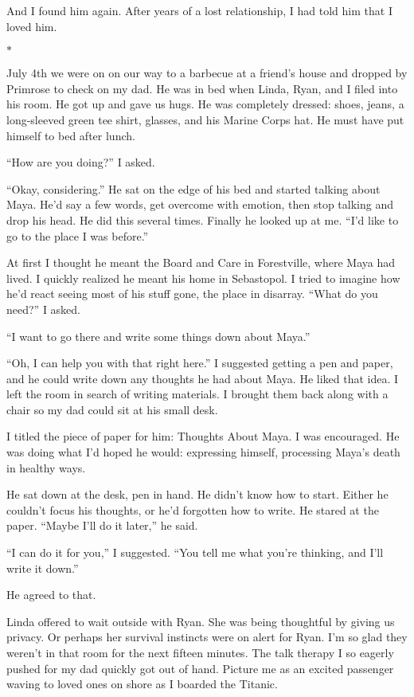 \documentclass[12pt]{book}
\begin{document}
And I found him again. After years of a lost relationship, I had told him that I loved him.

\begin{center}$*$\end{center}

July 4th we were on on our way to a barbecue at a friend's house and dropped by Primrose to check on my dad. He was in bed when Linda, Ryan, and I filed into his room. He got up and gave us hugs. He was completely dressed: shoes, jeans, a long-sleeved green tee shirt, glasses, and his Marine Corps hat. He must have put himself to bed after lunch.

``How are you doing?'' I asked.

``Okay, considering.'' He sat on the edge of his bed and started talking about Maya. He'd say a few words, get overcome with emotion, then stop talking and drop his head. He did this several times. Finally he looked up at me. ``I'd like to go to the place I was before.''

At first I thought he meant the Board and Care in Forestville, where Maya had lived. I quickly realized he meant his home in Sebastopol. I tried to imagine how he'd react seeing most of his stuff gone, the place in disarray. ``What do you need?'' I asked.

``I want to go there and write some things down about Maya.''

``Oh, I can help you with that right here.'' I suggested getting a pen and paper, and he could write down any thoughts he had about Maya. He liked that idea. I left the room in search of writing materials. I brought them back along with a chair so my dad could sit at his small desk.

I titled the piece of paper for him: Thoughts About Maya. I was encouraged. He was doing what I'd hoped he would: expressing himself, processing Maya's death in healthy ways.

He sat down at the desk, pen in hand. He didn't know how to start. Either he couldn't focus his thoughts, or he'd forgotten how to write. He stared at the paper. ``Maybe I'll do it later,'' he said.

``I can do it for you,'' I suggested. ``You tell me what you're thinking, and I'll write it down.''

He agreed to that.

Linda offered to wait outside with Ryan. She was being thoughtful by giving us privacy. Or perhaps her survival instincts were on alert for Ryan. I'm so glad they weren't in that room for the next fifteen minutes. The talk therapy I so eagerly pushed for my dad quickly got out of hand. Picture me as an excited passenger waving to loved ones on shore as I boarded the Titanic.
\end{document}
